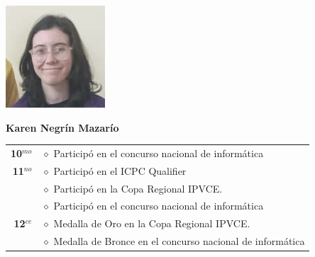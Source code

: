 \begin{minipage}{0.2\textwidth}
	\includegraphics[width=\linewidth]{img/concursantes/karen.png} %
\end{minipage}
\hfill
\begin{minipage}{0.7\textwidth}
	\textbf{Karen Negrín Mazarío}
	
	\vspace*{0.1in}
	\begin{tabular}{rl}
		
		\textbf{10$^{mo}$} &  $\diamond$ Participó en el concurso nacional de informática \\
		
		\textbf{11$^{no}$} & $\diamond$ Participó en el ICPC Qualifier \\
						   & $\diamond$ Participó en la Copa Regional IPVCE. \\			
		                   & $\diamond$ Participó en el concurso nacional de informática \\
		
		\textbf{12$^{ce}$} & $\diamond$ Medalla de Oro en la Copa Regional IPVCE.  \\
		                   &  $\diamond$ Medalla de Bronce en el concurso nacional de informática \\
		                    
		
		
	\end{tabular}
\end{minipage}

